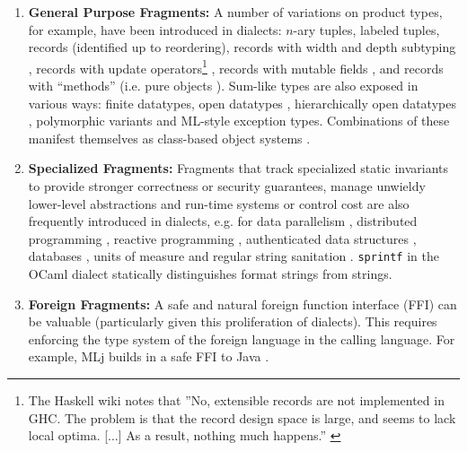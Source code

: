 \documentclass[10pt,preprint]{sigplanconf}
\begin{document}
\begin{enumerate}
\vspace{-5px}
\item 
\textbf{General Purpose Fragments:} 
A number of variations on product types, for example, have been introduced in dialects: 
$n$-ary tuples, 
labeled tuples, 
records (identified up to reordering), 
records with width and depth subtyping \cite{Cardelli:1984:SMI:1096.1098}, 
records with update operators\footnote{The Haskell wiki notes that ''No, extensible records are not implemented in GHC. The problem is that the record design space is large, and seems to lack local optima. [...] As a result, nothing much happens.'' \cite{GHCFAQ}} \cite{ocaml-manual}, 
records with mutable fields \cite{ocaml-manual}, 
and 
records with ``methods'' (i.e. pure objects \cite{TSLs}). 
 Sum-like types are also exposed in various ways: 
finite datatypes, 
open datatypes \cite{conf/ppdp/LohH06}, 
hierarchically open datatypes \cite{journals/toplas/MillsteinBC04}, 
polymorphic variants \cite{ocaml-manual} and 
ML-style exception types. Combinations of these manifest themselves as class-based object systems \cite{ocaml-manual}. 

\item
\textbf{Specialized Fragments:} Fragments that track specialized static invariants to provide stronger correctness or security guarantees, manage unwieldy lower-level abstractions and run-time systems or control cost are also frequently introduced in dialects, e.g. for data parallelism  \cite{chakravarty2007data}, distributed programming \cite{Murphy:2007:TDP:1793574.1793585}, reactive programming \cite{mandel2005reactiveml}, authenticated data structures \cite{Miller:2014:ADS:2535838.2535851}, databases \cite{Ohori:2011:MSM:2034773.2034815},  units of measure \cite{conf/cefp/Kennedy09} and regular string sanitation \cite{sanitation-psp14}. \verb|sprintf| in the OCaml dialect statically distinguishes format strings from strings.%

\item
\textbf{Foreign Fragments:} A safe and natural foreign function interface (FFI) can be valuable (particularly given this proliferation of dialects). This requires enforcing the type system of the foreign language in the calling language. %
For example, MLj builds in a safe FFI to Java \cite{Benton:1999:IWW:317636.317791}.
\end{enumerate}
\vspace{-5px}
\end{document}
